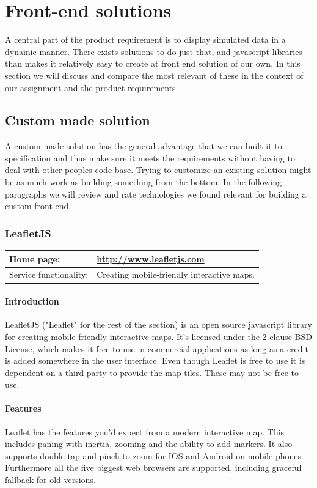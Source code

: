 \documentclass[11pt,a4paper,titlepage,oneside]{report}
\begin{document}
\section{Front-end solutions}
  A central part of the product requirement is to display simulated data in a dynamic manner. There exists solutions to do just that, and javascript libraries than makes it relatively easy to create at front end solution of our own. In this section we will discuss and compare the most relevant of these in the context of our assignment and the product requirements. 
  \subsection{Custom made solution}
    A custom made solution has the general advantage that we can built it to specification and thus make sure it meets the requirements without having to deal with other peoples code base. Trying to customize an existing solution might be as much work as building something from the bottom. In the following paragraphs we will review and rate technologies we found relevant for building a custom front end.
    \subsubsection{LeafletJS}
    \begin{tabular}{|p{4cm}|p{8cm}|}
      \hline
      Home page: & \url{http://www.leafletjs.com} \\
      \hline
      Service functionality: & Creating mobile-friendly interactive maps. \\
      \hline
    \end{tabular}
    
    \paragraph{Introduction} \indent
    LeafletJS ("Leaflet" for the rest of the section) is an \gls{open source} javascript library for creating mobile-friendly interactive maps. It's licensed under the \href{'https://github.com/Leaflet/Leaflet/blob/master/LICENSE'}{2-clause \gls{BSD} License}, which makes it free to use in commercial applications as long as a credit is added somewhere in the user interface.
    Even though Leaflet is free to use it is dependent on a third party to provide the map tiles. These may not be free to use.

    \paragraph{Features}
    Leaflet has the features you'd expect from a modern interactive map. This includes paning with inertia, zooming and the ability to add markers. It also supports double-tap and pinch to zoom for IOS and Android on mobile phones. Furthermore all the five biggest web browsers are supported, including graceful fallback for old versions.
    
\end{document}
